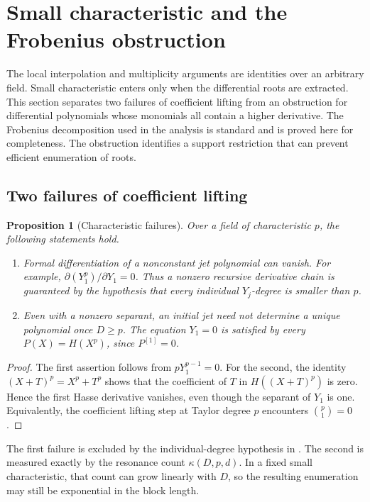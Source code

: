 \documentclass[11pt,letterpaper]{article}
\newtheorem{proposition}[proposition]{Proposition}
\theoremstyle{definition}
\begin{document}
 \section{Small characteristic and the Frobenius obstruction}
\label{sec:characteristic}

The local interpolation and multiplicity arguments are identities over an
arbitrary field.  Small characteristic enters only when the differential
roots are extracted.  This section separates two failures of coefficient
lifting from an obstruction for differential polynomials whose monomials all contain
a higher derivative. The Frobenius decomposition used in the analysis is
standard and is proved here for completeness. The obstruction identifies
a support restriction that can prevent efficient enumeration of roots.

\subsection{Two failures of coefficient lifting}

\begin{proposition}[Characteristic failures]
\label{prop:characteristic-failures}
Over a field of characteristic \(p\), the following statements hold.
\begin{enumerate}[label=\textup{(\roman*)}]
  \item Formal differentiation of a nonconstant jet polynomial can vanish.
        For example, \(\partial(Y_1^p)/\partial Y_1=0\). Thus a nonzero
        recursive derivative chain is guaranteed by the hypothesis that
        every individual \(Y_j\)-degree is smaller than \(p\).
  \item Even with a nonzero separant, an initial jet need not determine a
        unique polynomial once \(D\geq p\).  The equation \(Y_1=0\) is
        satisfied by every \(P(X)=H(X^p)\), since \(P^{[1]}=0\).
\end{enumerate}
\end{proposition}

\begin{proof}
The first assertion follows from \(pY_1^{p-1}=0\).  For the second, the
identity
\((X+T)^p=X^p+T^p\) shows that the coefficient of \(T\) in
\(H((X+T)^p)\) is zero.  Hence the first Hasse derivative vanishes, even
though the separant of \(Y_1\) is one.  Equivalently, the coefficient
lifting step at Taylor degree \(p\) encounters \(\binom p1=0\).
\end{proof}

The first failure is excluded by the individual-degree hypothesis in
.  The second is measured exactly by the
resonance count \(\kappa(D,p,d)\).  In a fixed small characteristic, that
count can grow linearly with \(D\), so the resulting enumeration may still
be exponential in the block length.
\end{document}
